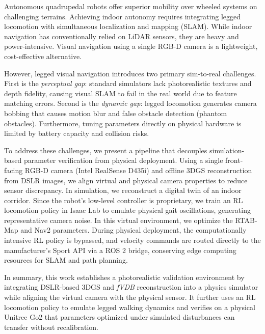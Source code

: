 \documentclass[10pt,twocolumn]{ICCAS}
\makeatletter
\def\section{\@startsection {section}{1}{\z@}{4.5ex plus 0.5ex
     minus .2ex}{1.2ex}{\center\fontsize{11pt}{11pt}\rm\bf\MakeUppercaseBlue}}
\makeatother
\begin{document}

\section{Introduction}
Autonomous quadrupedal robots offer superior mobility over wheeled systems on challenging terrains. Achieving indoor autonomy requires integrating legged locomotion with simultaneous localization and mapping (SLAM). While indoor navigation has conventionally relied on LiDAR sensors, they are heavy and power-intensive. Visual navigation using a single RGB-D camera is a lightweight, cost-effective alternative.

However, legged visual navigation introduces two primary sim-to-real challenges. First is the \textit{perceptual gap}: standard simulators lack photorealistic textures and depth fidelity, causing visual SLAM to fail in the real world due to feature matching errors. Second is the \textit{dynamic gap}: legged locomotion generates camera bobbing that causes motion blur and false obstacle detection (phantom obstacles). Furthermore, tuning parameters directly on physical hardware is limited by battery capacity and collision risks.

To address these challenges, we present a pipeline that decouples simulation-based parameter verification from physical deployment. Using a single front-facing RGB-D camera (Intel RealSense D435i) and offline 3DGS reconstruction from DSLR images, we align virtual and physical camera properties to reduce sensor discrepancy. In simulation, we reconstruct a digital twin of an indoor corridor. Since the robot's low-level controller is proprietary, we train an RL locomotion policy in Isaac Lab to emulate physical gait oscillations, generating representative camera noise. In this virtual environment, we optimize the RTAB-Map and Nav2 parameters. During physical deployment, the computationally intensive RL policy is bypassed, and velocity commands are routed directly to the manufacturer's Sport API via a ROS 2 bridge, conserving edge computing resources for SLAM and path planning.

In summary, this work establishes a photorealistic validation environment by integrating DSLR-based 3DGS and \textit{fVDB} reconstruction into a physics simulator while aligning the virtual camera with the physical sensor. It further uses an RL locomotion policy to emulate legged walking dynamics and verifies on a physical Unitree Go2 that parameters optimized under simulated disturbances can transfer without recalibration.
\end{document}
